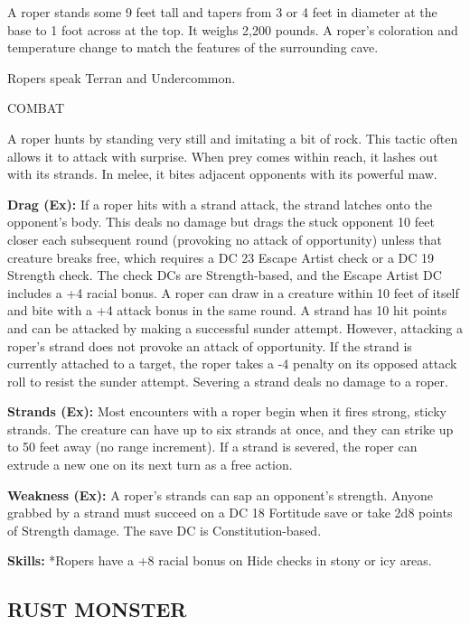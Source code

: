 \documentclass{article}
\begin{document}
A roper stands some 9 feet tall and tapers from 3 or 4 feet in diameter at the 
base to 1 foot across at the top. It weighs 2,200 pounds. A roper's coloration 
and temperature change to match the features of the surrounding cave.

Ropers speak Terran and Undercommon.

COMBAT

A roper hunts by standing very still and imitating a bit of rock. This tactic often 
allows it to attack with surprise. When prey comes within reach, it lashes out 
with its strands. In melee, it bites adjacent opponents with its powerful maw.

\textbf{Drag (Ex): }If a roper hits with a strand attack, the strand latches onto 
the opponent's body. This deals no damage but drags the stuck opponent 10 feet 
closer each subsequent round (provoking no attack of opportunity) unless that creature 
breaks free, which requires a DC 23 Escape Artist check or a DC 19 Strength check. 
The check DCs are Strength-based, and the Escape Artist DC includes a +4 racial 
bonus. A roper can draw in a creature within 10 feet of itself and bite with a 
+4 attack bonus in the same round. A strand has 10 hit points and can be attacked 
by making a successful sunder attempt. However, attacking a roper's strand does 
not provoke an attack of opportunity. If the strand is currently attached to a 
target, the roper takes a -4 penalty on its opposed attack roll to resist the sunder 
attempt. Severing a strand deals no damage to a roper.

\textbf{Strands (Ex):} Most encounters with a roper begin when it fires strong, 
sticky strands. The creature can have up to six strands at once, and they can strike 
up to 50 feet away (no range increment). If a strand is severed, the roper can 
extrude a new one on its next turn as a free action. 

\textbf{Weakness (Ex): }A roper's strands can sap an opponent's strength. Anyone 
grabbed by a strand must succeed on a DC 18 Fortitude save or take 2d8 points of 
Strength damage. The save DC is Constitution-based.

\textbf{Skills:} *Ropers have a +8 racial bonus on Hide checks in stony or icy 
areas.

\vspace{12pt}
\subsection*{{\LARGE{}RUST MONSTER}}
\end{document}
